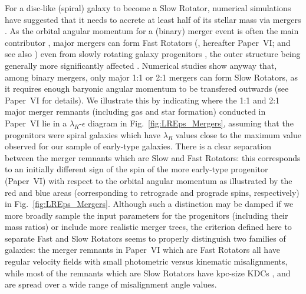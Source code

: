 \documentclass[useAMS,usenatbib,usegraphicx]{mn2e}
\begin{document}
For a disc-like (spiral) galaxy to become a Slow Rotator, numerical simulations
have suggested that it needs to accrete at least half of its stellar mass via
mergers \citep{Bournaud+07, Jesseit+09, Bois10, Bois11}.
As the orbital angular momentum for a (binary) merger event is often
the main contributor \citep{Khochfar+06},
major mergers can form Fast Rotators (\citet{Bois11}, hereafter Paper~VI; and see also \citet{SpringelHernquist05}) even from slowly rotating galaxy progenitors
\citep{diMatteo+09}, the outer structure being generally more significantly affected \citep{Coccato+09}. 
Numerical studies show anyway that, among binary mergers, only major 1:1 or 2:1 mergers can form
Slow Rotators, as it requires enough baryonic angular momentum to be transfered outwards
(see Paper~VI for details).
We illustrate this by indicating where the 1:1 and 2:1 major merger remnants (including
gas and star formation) conducted in Paper~VI lie in a 
$\lambda_R$-$\epsilon$ diagram in Fig.~\ref{fig:LREps_Mergers}, assuming that
the progenitors were spiral galaxies which have $\lambda_R$ values close to the
maximum value observed for our sample of early-type galaxies.  
There is a clear separation between the merger remnants which are Slow and
Fast Rotators: this corresponds to an initially different sign of the spin of the more
early-type progenitor (Paper~VI) with respect to the orbital angular
momentum as illustrated by the red and blue areas (corresponding to retrograde
and prograde spins, respectively) in Fig.~\ref{fig:LREps_Mergers}. Although such a distinction may be damped 
if we more broadly sample the input parameters for the progenitors (including their mass ratios)
or include more realistic merger trees, the criterion defined here to separate Fast 
and Slow Rotators seems to properly distinguish two families of galaxies:
the merger remnants in Paper~VI which are Fast Rotators 
all have regular velocity fields with small photometric versus kinematic misalignments, 
while most of the remnants which are Slow Rotators have kpc-size KDCs
\citep[see also][Paper~VI]{vdBosch+08, Hoffman+10}, and are spread
over a wide range of misalignment angle values.
\end{document}
